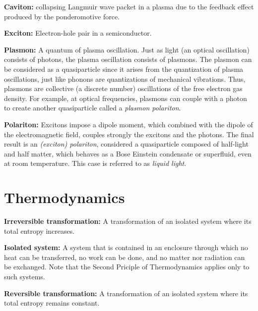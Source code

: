 \begin{list}{}{}
	\item \textbf{Caviton:} collapsing Langmuir wave packet in a plasma due to the feedback effect produced by the ponderomotive force.
	
	\item \textbf{Exciton:} Electron-hole pair in a semiconductor.
	
	\item \textbf{Plasmon:} A quantum of plasma oscillation. Just as light (an optical oscillation) consists of photons, the plasma oscillation consists of plasmons. The plasmon can be considered as a quasiparticle since it arises from the quantization of plasma oscillations, just like phonons are quantizations of mechanical vibrations. Thus, plasmons are collective (a discrete number) oscillations of the free electron gas density. For example, at optical frequencies, plasmons can couple with a photon to create another quasiparticle called a \emph{plasmon polariton}. 
	
	\item \textbf{Polariton:} Excitons impose a dipole moment, which combined with the dipole of the electromagnetic field, couples strongly the excitons and the photons. The final result is an \emph{(exciton) polariton}, considered a quasiparticle composed of half-light and half matter, which behaves as a Bose Einstein condensate or superfluid, even at room temperature. This case is referred to as \emph{liquid light}.
\end{list}

\section{Thermodynamics}

\begin{list}{}{}
	\item \textbf{Irreversible transformation:} A transformation of an isolated system where its total entropy increases.
	
	\item \textbf{Isolated system:} A system that is contained in an enclosure through which no heat can be transferred, no work can be done, and no matter nor radiation can be exchanged. Note that the Second Priciple of Thermodynamics applies only to such systems.
	
	\item \textbf{Reversible transformation:} A transformation of an isolated system where its total entropy remains constant.
\end{list}


